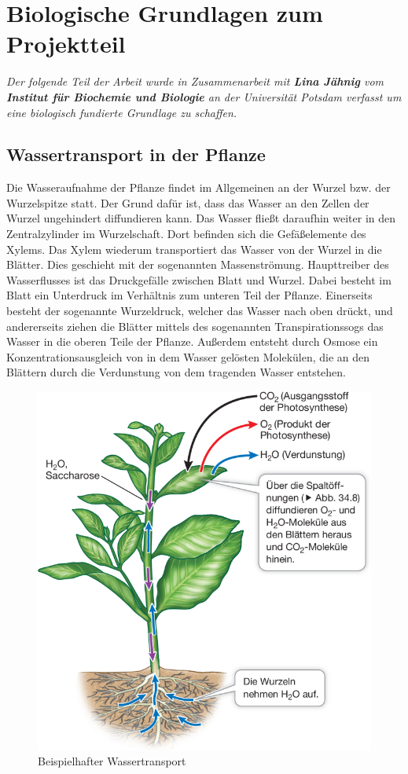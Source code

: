 \section{Biologische Grundlagen zum Projektteil}
\textit{Der folgende Teil der Arbeit wurde in Zusammenarbeit mit \textbf{Lina Jähnig} vom \textbf{Institut für Biochemie und Biologie} an der Universität Potsdam verfasst um eine biologisch fundierte Grundlage zu schaffen.}
\subsection{Wassertransport in der Pflanze}
Die Wasseraufnahme der Pflanze findet im Allgemeinen an der Wurzel bzw. der Wurzelspitze statt. Der Grund dafür ist, dass das Wasser an den Zellen der Wurzel ungehindert diffundieren kann. Das Wasser fließt daraufhin weiter in den Zentralzylinder im Wurzelschaft. Dort befinden sich die Gefäßelemente des Xylems. Das Xylem wiederum transportiert das Wasser von der Wurzel in die Blätter. Dies geschieht mit der sogenannten Massenströmung. Haupttreiber des Wasserflusses ist das Druckgefälle zwischen Blatt und Wurzel. Dabei besteht im Blatt ein Unterdruck im Verhältnis zum unteren Teil der Pflanze. Einerseits besteht der sogenannte Wurzeldruck, welcher das Wasser nach oben drückt, und andererseits ziehen die Blätter mittels des sogenannten Transpirationssogs das Wasser in die oberen Teile der Pflanze. Außerdem entsteht durch Osmose ein Konzentrationsausgleich von in dem Wasser gelösten Molekülen, die an den Blättern durch die Verdunstung von dem tragenden Wasser entstehen.\cite{urry2019}
\begin{figure}
    \centering
    \includegraphics[width=0.5\linewidth]{154381_10_De_34_Fig1_HTML.png}
    \caption{Beispielhafter Wassertransport}
    \label{fig:enter-label}
\end{figure}
